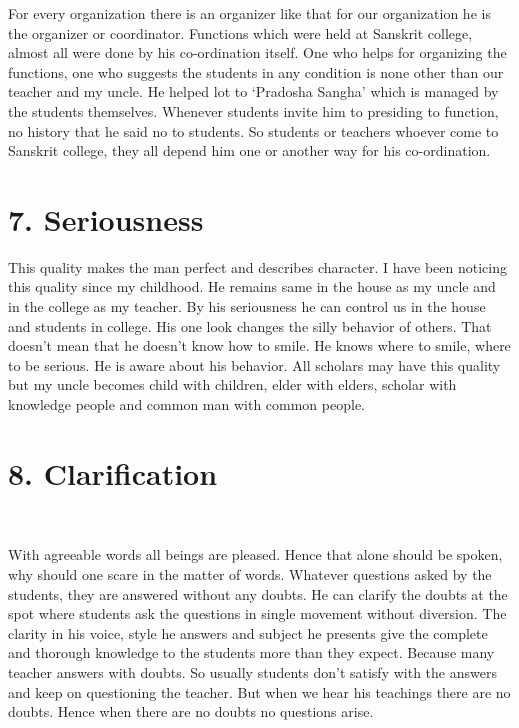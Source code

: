 For every organization there is an organizer like that for our organization he is the organizer or coordinator. Functions which were held at Sanskrit college, almost all were done by his co-ordination itself. One who helps for organizing the functions, one who suggests the students in any condition is none other than our teacher and my uncle.
He helped lot to ‘Pradosha Sangha’ which is managed by the students themselves. Whenever students invite him to presiding to function, no history that he said no to students. So students or teachers whoever come to Sanskrit college, they all depend him one or another way for his co-ordination.

\section*{7. Seriousness }

This quality makes the man perfect and describes character. I have been noticing this quality since my childhood. He remains same in the house as my uncle and in the college as my teacher. By his seriousness he can control us in the house and students in college. His one look changes the silly behavior of others. That doesn’t mean that he doesn’t know how to smile. He knows where to smile, where to be serious. He is aware about his behavior. All scholars may have this quality but my uncle becomes child with children, elder with elders, scholar with knowledge people and common man with common people.

\section*{8. Clarification }
\begin{center}
{\fontsize{15}{17}\selectfont
{}\\
}
\end{center}
With agreeable words all beings are pleased. Hence that alone should be spoken, why should one scare in the matter of words.
Whatever questions asked by the students, they are answered without any doubts. He can clarify the doubts at the spot where students ask the questions in single movement without diversion. The clarity in his voice, style he answers and subject he presents give the complete and thorough knowledge to the students more than they expect. Because many teacher answers with doubts. So usually students don’t satisfy with the answers and keep on questioning the teacher. But when we hear his teachings there are no doubts. Hence when there are no doubts no questions arise.

